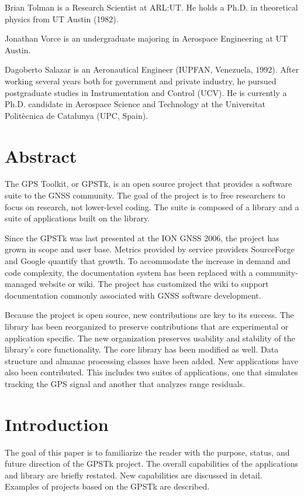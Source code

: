 \documentclass[letterpaper,ugly,10pt]{ion-gps}
\begin{document}
Brian Tolman is a Research Scientist at ARL:UT. He holds a
Ph.D. in theoretical physics from UT Austin (1982).

Jonathan Vorce is an undergraduate majoring in Aerospace Engineering at UT Austin.

Dagoberto Salazar is an Aeronautical Engineer (IUPFAN, Venezuela, 1992). After working several years both for government and private industry, he pursued postgraduate studies in Instrumentation and Control (UCV). He is currently a Ph.D. candidate in Aerospace Science and Technology at the Universitat Polit\`{e}cnica de Catalunya (UPC, Spain).

\section*{Abstract}
The GPS Toolkit, or GPSTk, is an open source project that provides a
software suite to the GNSS community. The goal of the project is to
free researchers to focus on research, not lower-level
coding. The suite is composed of a library and a suite of
applications built on the library.

Since the GPSTk was last presented at the ION GNSS 2006, the project has grown in scope and user base. Metrics provided by service providers SourceForge and Google quantify that growth. To accommodate the increase in demand and code complexity, the documentation system has been replaced with a community-managed website or wiki. The project has customized the wiki to support documentation commonly associated with GNSS software development.

Because the project is open source, new contributions are key to its success. The library has been reorganized to preserve contributions that are experimental or application specific. The new organization preserves usability and stability of the library's core functionality. The core library has been modified as well. Data structure and almanac processing classes have been added. New applications have also been contributed. This includes two suites of applications, one that simulates tracking the GPS signal and another that analyzes range residuals.


\section*{Introduction}

The goal of this paper is to familiarize the reader with the purpose, status, and future direction of the GPSTk project. The overall capabilities of the applications and library are briefly restated. New capabilities are discussed in detail. Examples of projects based on the GPSTk are described. 
\end{document}
